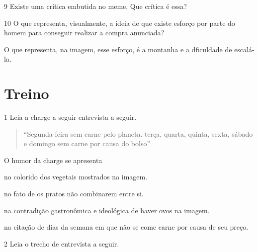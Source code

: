 
\num{9} Existe uma crítica embutida no meme. Que crítica é essa?


\num{10} O que representa, visualmente, a ideia de que existe esforço por parte
  do homem para conseguir realizar a compra anunciada?


O que representa, na imagem, esse esforço, é a montanha e a dficuldade
de escalá-la.

\section{Treino}

\num{1} Leia a charge a seguir entrevista a seguir.


\begin{quote}
``Segunda-feira sem carne pelo planeta. terça, quarta, quinta, sexta,
sábado e domingo sem carne por causa do bolso''
\end{quote}

O humor da charge se apresenta

\begin{escolha}
\item no colorido dos vegetais mostrados na imagem.

\item no fato de os pratos não combinarem entre si.

\item na contradição gastronômica e ideológica de haver ovos na imagem.

\item na citação de dias da semana em que não se come carne por causa de
seu preço.
\end{escolha}


\num{2} Leia o trecho de entrevista a seguir.

